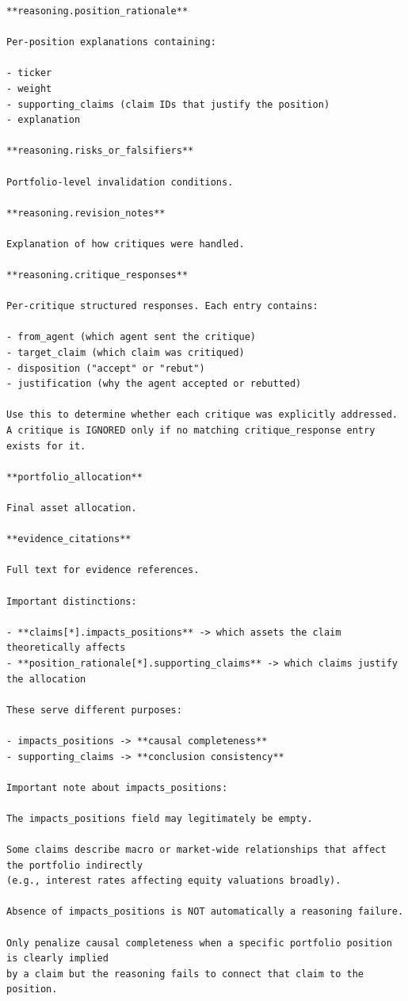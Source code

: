 \documentclass{article}
\begin{document}
\begin{lstlisting}[backgroundcolor=\color{promptbg}]
**reasoning.position_rationale**

Per-position explanations containing:

- ticker
- weight
- supporting_claims (claim IDs that justify the position)
- explanation

**reasoning.risks_or_falsifiers**

Portfolio-level invalidation conditions.

**reasoning.revision_notes**

Explanation of how critiques were handled.

**reasoning.critique_responses**

Per-critique structured responses. Each entry contains:

- from_agent (which agent sent the critique)
- target_claim (which claim was critiqued)
- disposition ("accept" or "rebut")
- justification (why the agent accepted or rebutted)

Use this to determine whether each critique was explicitly addressed.
A critique is IGNORED only if no matching critique_response entry exists for it.

**portfolio_allocation**

Final asset allocation.

**evidence_citations**

Full text for evidence references.

Important distinctions:

- **claims[*].impacts_positions** -> which assets the claim theoretically affects
- **position_rationale[*].supporting_claims** -> which claims justify the allocation

These serve different purposes:

- impacts_positions -> **causal completeness**
- supporting_claims -> **conclusion consistency**

Important note about impacts_positions:

The impacts_positions field may legitimately be empty.

Some claims describe macro or market-wide relationships that affect the portfolio indirectly
(e.g., interest rates affecting equity valuations broadly).

Absence of impacts_positions is NOT automatically a reasoning failure.

Only penalize causal completeness when a specific portfolio position is clearly implied
by a claim but the reasoning fails to connect that claim to the position.


\end{lstlisting}
\end{document}
